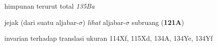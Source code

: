 himpunan terurut total {\it 135Ba}










{jejak }
(dari suatu aljabar-$\sigma$) {\it lihat} aljabar-$\sigma$ subruang ({\bf 121A})





















{invarian terhadap translasi }
ukuran 114Xf, 115Xd, 134A, 134Ye, 134Yf













































\indexmedskip























